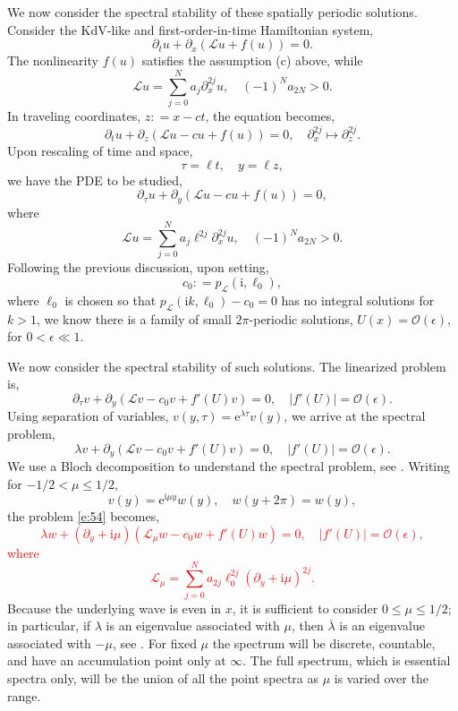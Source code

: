 \documentclass[review,onefignum,onetabnum]{siamart171218}
\def\coloneqq{\mathrel{\mathop:}=}
\newcommand{\rme}{\mathrm{e}}
\newcommand{\rmi}{\mathrm{i}}
\newcommand{\calL}{\mathcal{L}}
\newcommand{\calO}{\mathcal{O}}
\newcommand{\revised}[1]{ \textcolor{red}{#1} }
\begin{document}

We now consider the spectral stability of these spatially periodic solutions.
Consider the KdV-like and first-order-in-time Hamiltonian system,
\begin{equation}\label{e:52}
\partial_t u+\partial_x\left(\calL u+f(u)\right)=0.
\end{equation}
The nonlinearity $f(u)$ satisfies the assumption (c) above, while
\[
\calL u=\sum_{j=0}^Na_j\partial_x^{2j}u,\quad (-1)^Na_{2N}>0.
\]
In traveling coordinates, $z\coloneqq x-ct$, the equation becomes,
\[
\partial_tu+\partial_z\left(\calL u-cu+f(u)\right)=0,\quad
\partial_x^{2j}\mapsto\partial_z^{2j}.
\]
Upon rescaling of time and space,
\[
\tau=\ell t,\quad y=\ell z,
\]
we have the PDE to be studied,
\begin{equation}\label{e:53}
\partial_\tau u+\partial_y\left(\calL u-cu+f(u)\right)=0,
\end{equation}
where
\[
\calL u=\sum_{j=0}^Na_j\ell^{2j}\partial_x^{2j}u,\quad (-1)^Na_{2N}>0.
\]
Following the previous discussion, upon setting,
\[
c_0\coloneqq p_{\calL}(\rmi,\ell_0),
\]
where $\ell_0$ is chosen so that $p_{\calL}(\rmi k,\ell_0)-c_0=0$ has no integral solutions for $k>1$, we know there is a family of small $2\pi$-periodic solutions,
$U(x)=\calO(\epsilon)$, for $0<\epsilon\ll1$.

We now consider the spectral stability of such solutions. The linearized
problem is,
\[
\partial_\tau v+\partial_y\left(\calL v-c_0v+f'(U)v\right)=0,\quad |f'(U)|=\calO(\epsilon).
\]
Using separation of variables, $v(y,\tau)=\rme^{\lambda\tau}v(y)$, we arrive
at the spectral problem,
\begin{equation}\label{e:54}
\lambda v+\partial_y\left(\calL v-c_0v+f'(U)v\right)=0,\quad |f'(U)|=\calO(\epsilon).
\end{equation}
We use a Bloch decomposition to understand the spectral problem, see
\cite[Chapter~3.3]{kapitula:sad13}. Writing for $-1/2<\mu\le1/2$,
\[
v(y)=\rme^{\rmi\mu y}w(y),\quad w(y+2\pi)=w(y),
\]
the problem \cref{e:54} becomes,
\revised{
\begin{equation}\label{e:55}
\lambda w+(\partial_y+\rmi \mu)\left(\calL_\mu w-c_0w+f'(U)w\right)=0,\quad |f'(U)|=\calO(\epsilon),
\end{equation}
where
\[
\calL_\mu=\sum_{j=0}^Na_{2j}\ell_0^{2j}(\partial_y+\rmi \mu)^{2j}.
\]
}
Because
the underlying wave is even in $x$, it is sufficient to consider
$0\le\mu\le1/2$; in particular, if
$\lambda$ is an eigenvalue associated with $\mu$, then $\overline{\lambda}$
is an eigenvalue associated with $-\mu$, see \cite[Section~4]{haragus:ots08}. For fixed $\mu$ the spectrum will be
discrete, countable, and have an accumulation point only at $\infty$. The
full spectrum, which is essential spectra only, will be the union of all the point spectra as $\mu$ is varied over the range.
\end{document}
